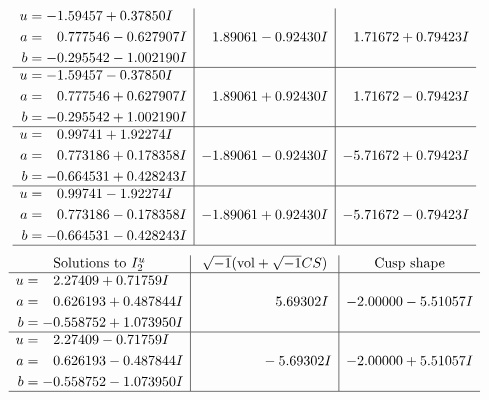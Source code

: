 \documentclass[1p]{elsarticle_modified}
\theoremstyle{definition}
\newcommand{\I}{\sqrt{-1}}
\begin{document}
$$\begin{array}{c|c|c}
\begin{aligned}
u &= -1.59457 + 0.37850 I \\
a &= \phantom{-}0.777546 - 0.627907 I \\
b &= -0.295542 - 1.002190 I\end{aligned}
 & \phantom{-}1.89061 - 0.92430 I & \phantom{-}1.71672 + 0.79423 I \\ \hline\begin{aligned}
u &= -1.59457 - 0.37850 I \\
a &= \phantom{-}0.777546 + 0.627907 I \\
b &= -0.295542 + 1.002190 I\end{aligned}
 & \phantom{-}1.89061 + 0.92430 I & \phantom{-}1.71672 - 0.79423 I \\ \hline\begin{aligned}
u &= \phantom{-}0.99741 + 1.92274 I \\
a &= \phantom{-}0.773186 + 0.178358 I \\
b &= -0.664531 + 0.428243 I\end{aligned}
 & -1.89061 - 0.92430 I & -5.71672 + 0.79423 I \\ \hline\begin{aligned}
u &= \phantom{-}0.99741 - 1.92274 I \\
a &= \phantom{-}0.773186 - 0.178358 I \\
b &= -0.664531 - 0.428243 I\end{aligned}
 & -1.89061 + 0.92430 I & -5.71672 - 0.79423 I\\
 \hline 
 \end{array}$$\newpage$$\begin{array}{c|c|c}  
\text{Solutions to }I^u_{2}& \I (\text{vol} + \sqrt{-1}CS) & \text{Cusp shape}\\
 \hline 
\begin{aligned}
u &= \phantom{-}2.27409 + 0.71759 I \\
a &= \phantom{-}0.626193 + 0.487844 I \\
b &= -0.558752 + 1.073950 I\end{aligned}
 & \phantom{-0.000000 -}5.69302 I & -2.00000 - 5.51057 I \\ \hline\begin{aligned}
u &= \phantom{-}2.27409 - 0.71759 I \\
a &= \phantom{-}0.626193 - 0.487844 I \\
b &= -0.558752 - 1.073950 I\end{aligned}
 & \phantom{-0.000000 } -5.69302 I & -2.00000 + 5.51057 I\\
 \hline 
 \end{array}$$\newpage\newpage\renewcommand{\arraystretch}{1}
\end{document}
